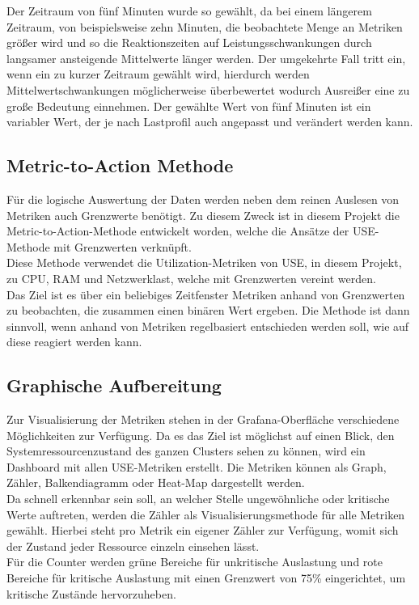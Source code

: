 \documentclass[a4paper,10pt]{scrartcl}
\begin{document}
Der Zeitraum von fünf Minuten wurde so gewählt, da bei einem längerem Zeitraum, von beispielsweise zehn Minuten, die beobachtete Menge an Metriken größer wird und so die Reaktionszeiten auf Leistungsschwankungen durch langsamer ansteigende Mittelwerte länger werden.
Der umgekehrte Fall tritt ein, wenn ein zu kurzer Zeitraum gewählt wird, hierdurch werden Mittelwertschwankungen möglicherweise überbewertet wodurch Ausreißer eine zu große Bedeutung einnehmen.
Der gewählte Wert von fünf Minuten ist ein variabler Wert, der je nach Lastprofil auch angepasst und verändert werden kann.

\subsection{Metric-to-Action Methode}

Für die logische Auswertung der Daten werden neben dem reinen Auslesen von Metriken auch Grenzwerte benötigt. Zu diesem Zweck ist in diesem Projekt die \glqq Metric-to-Action\grqq-Methode entwickelt worden, welche die Ansätze der USE-Methode mit Grenzwerten verknüpft.\\
Diese Methode verwendet die Utilization-Metriken von USE, in diesem Projekt, zu CPU, RAM und Netzwerklast, welche mit Grenzwerten vereint werden.\\
Das Ziel ist es über ein beliebiges Zeitfenster Metriken anhand von Grenzwerten zu beobachten, die zusammen einen binären Wert ergeben. Die Methode ist dann sinnvoll, wenn anhand von Metriken regelbasiert entschieden werden soll, wie auf diese reagiert werden kann.

\subsection{Graphische Aufbereitung}

Zur Visualisierung der Metriken stehen in der Grafana-Oberfläche verschiedene Möglichkeiten zur Verfügung. Da es das Ziel ist möglichst auf einen Blick, den Systemressourcenzustand des ganzen Clusters sehen zu können, wird ein Dashboard mit allen USE-Metriken erstellt. Die Metriken können als Graph, Zähler, Balkendiagramm oder Heat-Map dargestellt werden.\\
Da schnell erkennbar sein soll, an welcher Stelle ungewöhnliche oder kritische Werte auftreten, werden die Zähler als Visualisierungsmethode für alle Metriken gewählt. Hierbei steht pro Metrik ein eigener Zähler zur Verfügung, womit sich der Zustand jeder Ressource einzeln einsehen lässt.\\
Für die Counter werden grüne Bereiche für unkritische Auslastung und rote Bereiche für kritische Auslastung mit einen Grenzwert von 75\% eingerichtet, um kritische Zustände hervorzuheben.
\end{document}
